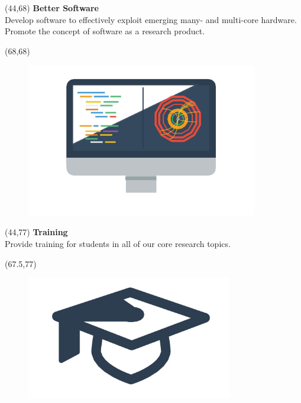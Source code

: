 \documentclass[final]{beamer}
\begin{document}
\begin{frame}{}
\begin{textblock}{23}(44,68)
\textcolor{mybluelabel}{\bf Better Software} \\
Develop software to effectively exploit emerging many- and multi-core hardware. 
Promote the concept of software as a research product.
\end{textblock}

\begin{textblock}{12.0}(68,68)
\begin{figure}[tbph]
\centering
\includegraphics[width=0.9\textwidth]{images/better-software.jpg}
\end{figure}
\end{textblock}

\begin{textblock}{22.5}(44,77)
\textcolor{mybluelabel}{\bf Training} \\
Provide training for students in all of our core research topics.
\end{textblock}

\begin{textblock}{12.5}(67.5,77)
\begin{figure}[tbph]
\centering
\includegraphics[width=0.8\textwidth]{images/training.jpg}
\end{figure}
\end{textblock}



\end{frame}
\end{document}
